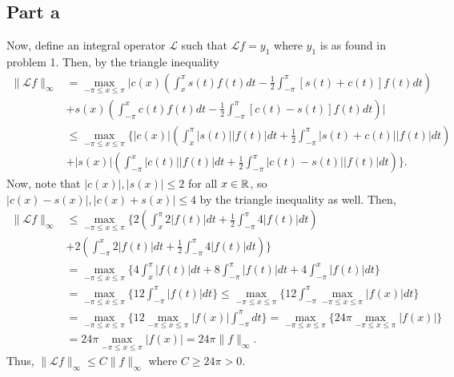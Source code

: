 \documentclass{article}
\begin{document}
\subsection{Part a}
Now, define an integral operator $\mathcal{L}$ such that $\mathcal{L}f=y_1$ where $y_1$ is as found in problem 1. Then, by the triangle inequality
\begin{align*}
\|\mathcal L f\|_\infty&=\max_{-\pi \leq x \leq \pi}\biggr|c(x) \left(\int_x^\pi s(t) f(t) d t  - \frac{1}{2} \int_{-\pi}^\pi [s(t) + c(t)] f(t) d t  \right) \\
    & + s(x) \left(\int_{-\pi}^x c(t) f(t) d t - \frac{1}{2} \int_{-\pi}^\pi [c(t) - s(t)] f(t) d t \right)\biggr|\\&\leq
\max_{-\pi \leq x \leq \pi}\biggr\{|c(x)| \left(\int_x^\pi |s(t)| |f(t)| d t  + \frac{1}{2} \int_{-\pi}^\pi |s(t) + c(t)| |f(t)| d t  \right) \\
    & + |s(x)| \left(\int_{-\pi}^x |c(t)| |f(t)| d t + \frac{1}{2} \int_{-\pi}^\pi |c(t) - s(t)| |f(t)| d t \right)\biggr\}.
\end{align*}
Now, note that $|c(x)|,|s(x)|\leq2$ for all $x\in\mathbb{R}$, so $|c(x)-s(x)|,|c(x)+s(x)|\leq4$ by the triangle inequality as well. Then, 
\begin{align*}
 \|\mathcal L f\|_\infty&\leq   \max_{-\pi \leq x \leq \pi}\biggr\{2 \left(\int_x^\pi 2 |f(t)| d t  + \frac{1}{2} \int_{-\pi}^\pi 4 |f(t)| d t  \right) \\
    & + 2 \left(\int_{-\pi}^x 2 |f(t)| d t + \frac{1}{2} \int_{-\pi}^\pi 4 |f(t)| d t \right)\biggr\}\\&=
    \max_{-\pi \leq x \leq \pi}\biggr\{4 \int_x^\pi  |f(t)| d t  +  8\int_{-\pi}^\pi  |f(t)| d t    + 4\int_{-\pi}^x  |f(t)| d t\biggr\}\\&=
    \max_{-\pi \leq x \leq \pi}\biggr\{ 12\int_{-\pi}^\pi  |f(t)| d t   \biggr\}\leq\max_{-\pi \leq x \leq \pi}\biggr\{ 12\int_{-\pi}^\pi  \max_{-\pi \leq x \leq \pi}|f(x)| d t   \biggr\}\\&=
    \max_{-\pi \leq x \leq \pi}\biggr\{12 \max_{-\pi \leq x \leq \pi}|f(x)|\int_{-\pi}^\pi   d t   \biggr\}=\max_{-\pi \leq x \leq \pi}\biggr\{ 24\pi\max_{-\pi \leq x \leq \pi}|f(x)| \biggr\}\\&=
    24\pi \max_{-\pi \leq x \leq \pi}|f(x)|=24\pi\|f\|_\infty. 
\end{align*}
Thus, $\|\mathcal L f\|_\infty \leq C \|f\|_\infty$ where $C\geq24\pi>0$.
\end{document}
